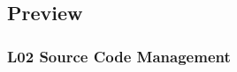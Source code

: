 %
%
%
%
%
%
%
%
%
%

\subsection{Preview}

\begin{frame}
	\frametitle{L02 Source Code Management}
\end{frame}



\nocite{raab2017introducing}

\appendix

\begin{frame}[allowframebreaks]
	
	
\end{frame}




